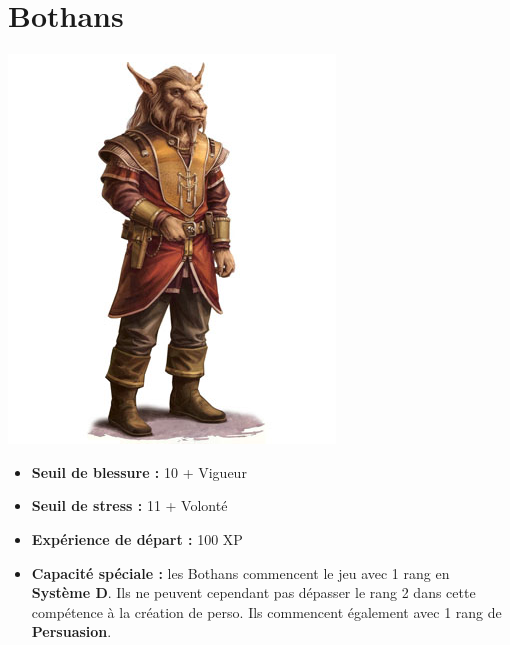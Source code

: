 \documentclass{article}
\begin{document}
\section*{Bothans}
\noindent\begin{minipage}{0.3\textwidth}
	\includegraphics[width=1\linewidth]{../img/species/bothan}
\end{minipage}
\hfill
\begin{minipage}{0.7\textwidth}\raggedleft
	\begin{itemize}
		\item \textbf{Seuil de blessure :} 10 + Vigueur 
		\item \textbf{Seuil de stress :} 11 + Volonté 
		\item \textbf{Expérience de départ :} 100 XP
		\item \textbf{Capacité spéciale :} les Bothans commencent le jeu avec 1 rang en \textbf{Système D}. Ils ne peuvent cependant pas dépasser le rang 2 dans cette compétence à la création de perso. Ils commencent également avec 1 rang de \textbf{Persuasion}.
	\end{itemize}
\end{minipage}
\end{document}
